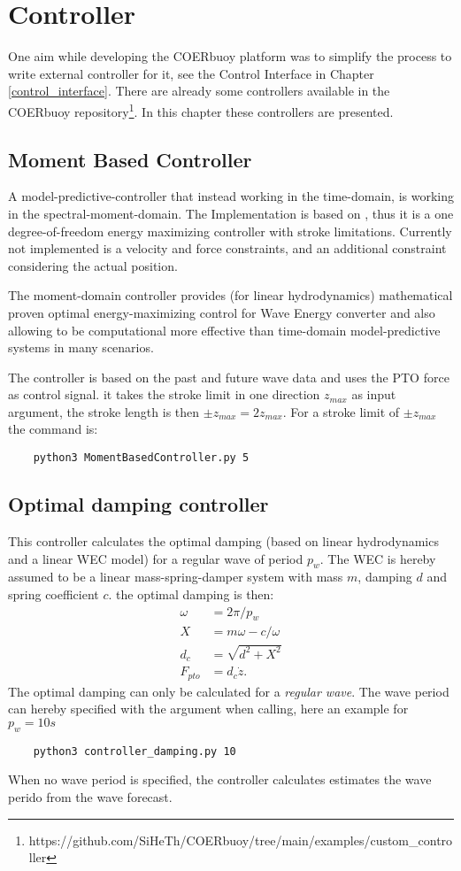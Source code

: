 \documentclass[oneside,10pt,a4paper]{book}
\begin{document}
\section{Controller}
One aim while developing the COERbuoy platform was to simplify the process to write external controller for it, see the Control Interface in Chapter \ref{control_interface}. There are already some controllers available in the COERbuoy repository\footnote{https://github.com/SiHeTh/COERbuoy/tree/main/examples/custom\_controller}. In this chapter these controllers are presented.
\subsection{Moment Based Controller}
A model-predictive-controller that instead working in the time-domain, is working in the spectral-moment-domain. The Implementation is based on \cite{control_mbc_horizon}, thus it is a one degree-of-freedom energy maximizing controller with stroke limitations. Currently not implemented is a velocity and force constraints, and an additional constraint considering the actual position.

The moment-domain controller provides (for linear hydrodynamics) mathematical proven optimal energy-maximizing control for Wave Energy converter and also allowing to be computational more effective than time-domain model-predictive systems in many scenarios.

The controller is based on the past and future wave data and uses the PTO force as control signal. it takes the stroke limit in one direction $z_{max}$ as input argument, the stroke length is then $\pm z_{max}=2z_{max}$. For a stroke limit of $\pm z_{max}$ the command is:
\begin{verbatim}
	python3 MomentBasedController.py 5
\end{verbatim}
\subsection{Optimal damping controller}
This controller calculates the optimal damping (based on linear hydrodynamics and a linear WEC model) for a regular wave of period $p_w$. The WEC is hereby assumed to be a linear mass-spring-damper system with mass $m$, damping $d$ and spring coefficient $c$. the optimal damping is then:
\begin{align*}
	\omega&=2\pi/p_w\\
	X&=m\omega-c/\omega\\
	d_c&=\sqrt{d^2+X^2}\\
	F_{pto}&=d_c\dot{z}\text{.}
\end{align*}
The optimal damping can only be calculated for a \textit{regular wave}. The wave period can hereby specified with the argument when calling, here an example for $p_w=10 s$
\begin{verbatim}
	python3 controller_damping.py 10
\end{verbatim}
When no wave period is specified, the controller calculates estimates the wave perido from the wave forecast.
\end{document}
